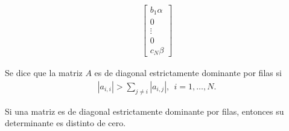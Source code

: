 \begin{ejemplo}
\begin{align*}
\begin{bmatrix}
                                                                                     b_1 \alpha \\
                                                                                     0          \\
                                                                                     \vdots     \\
                                                                                     0          \\
                                                                                     c_N\beta
                                                                                 \end{bmatrix}
    \end{align*}
\end{ejemplo}

\begin{defi}
    Se dice que la matriz $A$ es de diagonal estrictamente dominante por filas si
    \begin{align*}
        |a_{i,i}| > \sum_{j \not = i} |a_{i,j}|, \ \ i = 1,\ldots,N.
    \end{align*}
\end{defi}

\begin{teo}
    Si una matriz es de diagonal estrictamente dominante por filas, entonces su determinante es distinto de cero.
\end{teo}

